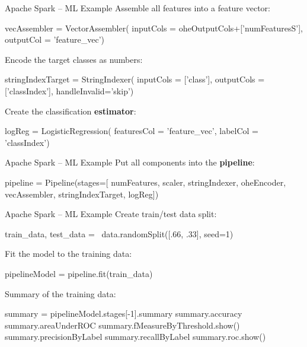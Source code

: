 \documentclass[ignorenonframetext,xcolor=x11names]{beamer}
\begin{document}
\begin{frame}[label=withcode,fragile]{Apache Spark -- ML Example}
Assemble all features into a feature vector:
\begin{pythoncode}
vecAssembler = VectorAssembler(
    inputCols = oheOutputCols+['numFeaturesS'],
    outputCol = 'feature_vec')
\end{pythoncode}
Encode the target classes as numbers:
\begin{pythoncode}
stringIndexTarget = StringIndexer(
    inputCols = ['class'],
    outputCols = ['classIndex'],
    handleInvalid='skip')
\end{pythoncode}    
Create the classification \textbf{estimator}:
\begin{pythoncode}
logReg = LogisticRegression(
    featuresCol = 'feature_vec',
    labelCol = 'classIndex')
\end{pythoncode}
\end{frame}

\begin{frame}[label=withcode,fragile]{Apache Spark -- ML Example}
Put all components into the \textbf{pipeline}:
\begin{pythoncode}
pipeline = Pipeline(stages=[
    numFeatures,
    scaler,
    stringIndexer,
    oheEncoder,
    vecAssembler,
    stringIndexTarget,
    logReg])
\end{pythoncode}
\end{frame}


\begin{frame}[label=withcode,fragile]{Apache Spark -- ML Example}
Create train/test data split:
\begin{pythoncode}
train_data, test_data = \
    data.randomSplit([.66, .33], seed=1)
\end{pythoncode}
Fit the model to the training data:
\begin{pythoncode}
pipelineModel = pipeline.fit(train_data)
\end{pythoncode}
Summary of the training data:
\begin{pythoncode}
summary = pipelineModel.stages[-1].summary
summary.accuracy
summary.areaUnderROC
summary.fMeasureByThreshold.show()
summary.precisionByLabel
summary.recallByLabel
summary.roc.show()
\end{pythoncode}
\end{frame}
\end{document}
